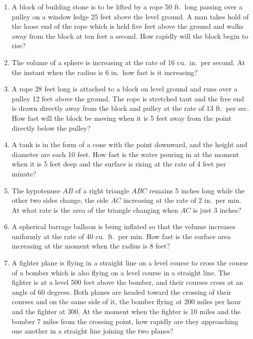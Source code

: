 \begin{enumerate}
    \item A block of building stone is to be lifted by a rope 50 ft.\ long passing over a pulley on a window ledge 25 feet above the level ground. A man takes hold of the loose end of the rope which is held five feet above the ground and walks away from the block at ten feet a second. How rapidly will the block begin to rise?

    \item The volume of a sphere is increasing at the rate of 16 cu.\ in.\ per second. At the instant when the radius is 6 in.\ how fast is it increasing?

    \item A rope 28 feet long is attached to a block on level ground and runs over a pulley 12 feet above the ground. The rope is stretched taut and the free end is drawn directly away from the block and pulley at the rate of 13 ft.\ per sec. How fast will the block be moving when it is 5 feet away from the point directly below the pulley?

    \item A tank is in the form of a cone with the point downward, and the height and diameter are each 10 feet. How fast is the water pouring in at the moment when it is 5 feet deep and the surface is rising at the rate of 4 feet per minute?

    \item The hypotenuse $AB$ of a right triangle $ABC$ remains 5 inches long while the other two sides change, the side $AC$ increasing at the rate of 2 in.\ per min. At what rate is the area of the triangle changing when $AC$ is just 3 inches?

    \item A spherical barrage balloon is being inflated so that the volume increases uniformly at the rate of 40 cu.\ ft.\ per min. How fast is the surface area increasing at the moment when the radius is 8 feet?

    \item A fighter plane is flying in a straight line on a level course to cross the course of a bomber which is also flying on a level course in a straight line. The fighter is at a level 500 feet above the bomber, and their courses cross at an angle of 60 degrees. Both planes are headed toward the crossing of their courses and on the same side of it, the bomber flying at 200 miles per hour and the fighter at 300. At the moment when the fighter is 10 miles and the bomber 7 miles from the crossing point, how rapidly are they approaching one another in a straight line joining the two planes?
\end{enumerate}
